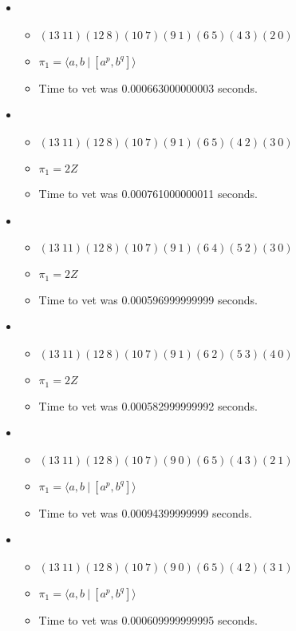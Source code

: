 \documentclass{article}
\begin{document}
\begin{itemize}
\begin{itemize}
\end{itemize}
\item \begin{itemize}
      \item $(13\ 11)(12\ 8)(10\ 7)(9\ 1)(6\ 5)(4\ 3)(2\ 0)$
      \item $\pi_1 = \langle a,b\ |\ [a^p,b^q]\rangle$
      \item Time to vet was 0.000663000000003 seconds.
\end{itemize}
\item \begin{itemize}
      \item $(13\ 11)(12\ 8)(10\ 7)(9\ 1)(6\ 5)(4\ 2)(3\ 0)$
      \item $\pi_1 =2 Z$
      \item Time to vet was 0.000761000000011 seconds.
\end{itemize}
\item \begin{itemize}
      \item $(13\ 11)(12\ 8)(10\ 7)(9\ 1)(6\ 4)(5\ 2)(3\ 0)$
      \item $\pi_1 =2 Z$
      \item Time to vet was 0.000596999999999 seconds.
\end{itemize}
\item \begin{itemize}
      \item $(13\ 11)(12\ 8)(10\ 7)(9\ 1)(6\ 2)(5\ 3)(4\ 0)$
      \item $\pi_1 =2 Z$
      \item Time to vet was 0.000582999999992 seconds.
\end{itemize}
\item \begin{itemize}
      \item $(13\ 11)(12\ 8)(10\ 7)(9\ 0)(6\ 5)(4\ 3)(2\ 1)$
      \item $\pi_1 = \langle a,b\ |\ [a^p,b^q]\rangle$
      \item Time to vet was 0.00094399999999 seconds.
\end{itemize}
\item \begin{itemize}
      \item $(13\ 11)(12\ 8)(10\ 7)(9\ 0)(6\ 5)(4\ 2)(3\ 1)$
      \item $\pi_1 = \langle a,b\ |\ [a^p,b^q]\rangle$
      \item Time to vet was 0.000609999999995 seconds.
\end{itemize}

\end{itemize}
\end{document}
